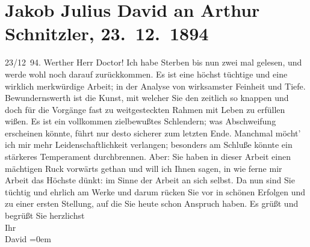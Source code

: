 

         \renewcommand{\erwaehnteOrte}{Orte: Wien}
         \renewcommand{\erwaehnteWerke}{Werke: Sterben. Novelle}
               \section[Jakob Julius David an Arthur Schnitzler, 23. 12. 1894]{ Jakob Julius David an Arthur Schnitzler, 23. 12. 1894}\nopagebreak{}\rehead{ }\begin{ledgroupsized}[t]{13cm}\normalsize\beginnumbering \toendnotes[C]{\smallbreak\pagebreak[2]} 
\toendnotes[C]{\smallbreak}\pstart
           \raggedleft{}{\pb}23/12 94.\pend
           \pstart\center{}Werther Herr Doctor!\pend\pstart
           Ich habe Sterben bis nun zwei mal gelesen, und
               werde wohl noch darauf zurückkommen. Es ist eine höchst tüchtige und eine wirklich
               merkwürdige Arbeit; in der Analyse von wirksamster Feinheit und Tiefe.
               Bewundernswerth ist die Kunst, mit welcher Sie den zeitlich so knappen und doch für
               die Vorgänge fast zu weitgesteckten Rahmen mit Leben zu erfüllen wißen. Es ist ein
               vollkommen zielbewußtes Schlendern; was Abschweifung erscheinen könnte, führt nur
               desto sicherer zum letzten Ende. Manchmal möcht’ ich mir mehr Leidenschaftlichkeit
               verlangen; besonders am Schluße könnte ein stärkeres Temperament durchbrennen. Aber:
               Sie haben in dieser Arbeit
               einen mächtigen Ruck vorwärts gethan und will ich Ihnen sagen, in wie ferne mir
               Arbeit das Höchste dünkt: im Sinne der Arbeit an sich selbst. Da nun sind Sie tüchtig
               und ehrlich am Werke und darum rücken Sie vor in schönen Erfolgen und zu einer ersten
               Stellung, auf die Sie heute schon Anspruch haben.\pend
           \pstart
           Es grüßt und begrüßt Sie herzlichst{\\[\baselineskip]}Ihr{\\[\baselineskip]}\spacefill\mbox{David}\pend
           \leftskip=0em{}
         

\end{ledgroupsized}
